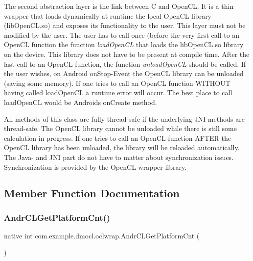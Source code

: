 The second abstraction layer is the link between C and Open\+CL. It is a thin wrapper that loads dynamically at runtime the local Open\+CL library (lib\+Open\+C\+L.\+so) and exposes its functionality to the user. This layer must not be modified by the user. The user has to call once (before the very first call to an Open\+CL function the function {\itshape load\+Open\+CL} that loads the lib\+Open\+C\+L.\+so library on the device. This library does not have to be present at compile time. After the last call to an Open\+CL function, the function {\itshape unload\+Open\+CL} should be called. If the user wishes, on Android on\+Stop-\/\+Event the Open\+CL library can be unloaded (saving some memory). If one tries to call an Open\+CL function W\+I\+T\+H\+O\+UT having called \textquotesingle{}load\+Open\+CL\textquotesingle{} a runtime error will occur. The best place to call \textquotesingle{}load\+Open\+CL\textquotesingle{} would be Androids \textquotesingle{}on\+Create\textquotesingle{} method.

All methods of this class are fully thread-\/safe if the underlying J\+NI methods are thread-\/safe. The Open\+CL library cannot be unloaded while there is still some calculation in progress. If one tries to call an Open\+CL function A\+F\+T\+ER the Open\+CL library has been unloaded, the library will be reloaded automatically. The Java-\/ and J\+NI part do not have to matter about synchronization issues. Synchronization is provided by the Open\+CL wrapper library.

\subsection{Member Function Documentation}
\mbox{\label{classcom_1_1example_1_1dmocl_1_1oclwrap_ae24bb606cc482ba27e0dbdca97b377ea}} 
\subsubsection{\texorpdfstring{Andr\+C\+L\+Get\+Platform\+Cnt()}{AndrCLGetPlatformCnt()}}
{\footnotesize\ttfamily native int com.\+example.\+dmocl.\+oclwrap.\+Andr\+C\+L\+Get\+Platform\+Cnt (\begin{DoxyParamCaption}{ }\end{DoxyParamCaption})}


